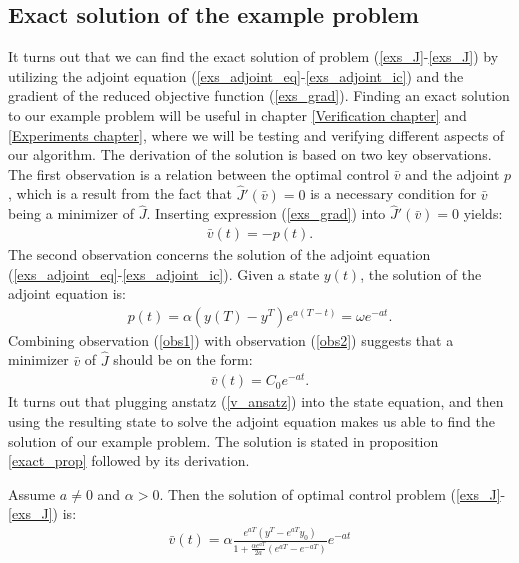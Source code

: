 \subsection{Exact solution of the example problem} \label{exact_sec}
It turns out that we can find the exact solution of problem (\ref{exs_J}-\ref{exs_J}) by utilizing the adjoint equation (\ref{exs_adjoint_eq}-\ref{exs_adjoint_ic}) and the gradient of the reduced objective function (\ref{exs_grad}). Finding an exact solution to our example problem will be useful in chapter \ref{Verification chapter} and \ref{Experiments chapter}, where we will be testing and verifying different aspects of our algorithm. The derivation of the solution is based on two key observations. The first observation is a relation between the optimal control $\bar v$ and the adjoint $p$, which is a result from the fact that $\hat J'(\bar v)=0$ is a necessary condition for $\bar v$ being a minimizer of $\hat J$. Inserting expression (\ref{exs_grad}) into $\hat J'(\bar v)=0$ yields:
\begin{align}
\bar v(t)=-p(t). \label{obs1}
\end{align} 
The second observation concerns the solution of the adjoint equation (\ref{exs_adjoint_eq}-\ref{exs_adjoint_ic}). Given a state $y(t)$, the solution of the adjoint equation is:
\begin{align}
p(t) = \alpha(y(T)-y^T)e^{a(T-t)} = \omega e^{-at}. \label{obs2}
\end{align}
Combining observation (\ref{obs1}) with observation (\ref{obs2}) suggests that a minimizer $\bar v$ of $\hat J$ should be on the form:
\begin{align}
\bar v(t) = C_0 e^{-at}. \label{v_ansatz}
\end{align}
It turns out that plugging anstatz (\ref{v_ansatz}) into the state equation, and then using the resulting state to solve the adjoint equation makes us able to find the solution of our example problem. The solution is stated in proposition \ref{exact_prop} followed by its derivation.
\begin{proposition} \label{exact_prop}
Assume $a\neq0$ and $\alpha>0$. Then the solution of optimal control problem (\ref{exs_J}-\ref{exs_J}) is:
\begin{align}
\bar v(t) = \alpha\frac{e^{aT}(y^T-e^{aT}y_0)}{1+\frac{\alpha e^{aT}}{2a}(e^{aT}-e^{-aT})}e^{-at}
\end{align}
\end{proposition}
